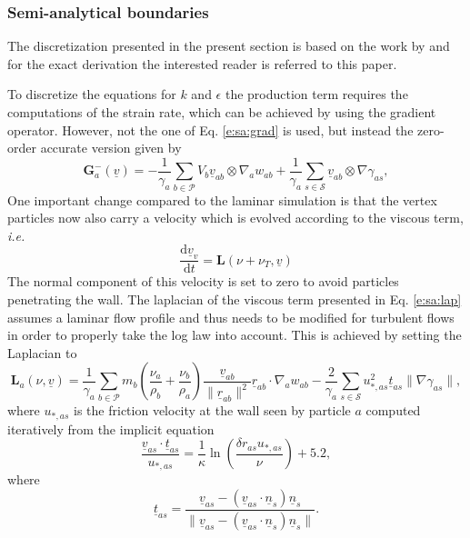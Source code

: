 \documentclass[12pt]{memoir}
\newcommand{\uvec}[1]{\underline{#1}}
\newcommand{\td}{\text{d}}
\newcommand{\tdv}[2]{\frac{\td #1}{\td #2}}
\newcommand{\ie}{\textit{i.e.}~}
\newcommand{\sumP}{\underset{b \in \mathcal{P}}{\sum}}
\newcommand{\sumS}{\underset{s \in \mathcal{S}}{\sum}}
\newcommand{\Grad}{\textbf{G}}
\newcommand{\Lap}{\textbf{L}}
\begin{document}
\subsubsection{Semi-analytical boundaries}
The discretization presented in the present section is based on the work
by \cite{leroy_unified_2014} and for the exact derivation the interested
reader is referred to this paper.

To discretize the equations for $k$ and $\epsilon$ the production term
requires the computations of the strain rate, which can be achieved by
using the gradient operator. However, not the one of Eq.
\eqref{e:sa:grad} is used, but instead the zero-order accurate version
given by
\begin{equation}
\Grad^-_a(\uvec{v}) = - \frac{1}{\gamma_a}\sumP V_b \uvec{v}_{ab} \otimes \nabla_a w_{ab}
 +\frac{1}{\gamma_a}\sumS \uvec{v}_{ab} \otimes \nabla \gamma_{as},
\label{e:turb:grad-}
\end{equation}
One important change compared to the laminar simulation is that the
vertex particles now also carry a velocity which is evolved according to
the viscous term, \ie
\begin{equation}
\tdv{\uvec{v}_v}{t} = \Lap(\nu + \nu_T, \uvec{v})
\label{e:turb:vert-vel}
\end{equation}
The normal component of this velocity is set to zero to avoid particles
penetrating the wall. The laplacian of the viscous term presented in Eq.
\eqref{e:sa:lap} assumes a laminar flow profile and thus needs to be
modified for turbulent flows in order to properly take the log law into
account. This is achieved by setting the Laplacian to
\begin{equation}
\Lap_a(\nu, \uvec{v}) = \frac{1}{\gamma_a}\sumP m_b \left(\frac{\nu_a}{\rho_b} + \frac{\nu_b}{\rho_a}\right) \frac{\uvec{v}_{ab}}{\|\uvec{r}_{ab}\|^2}\uvec{r}_{ab}\cdot \nabla_a w_{ab}
 - \frac{2}{\gamma_a} \sumS u_{*,as}^2 \uvec{t}_{as} \|\nabla \gamma_{as}\|,
\label{e:turb:lap}
\end{equation}
where $u_{*,as}$ is the friction velocity at the wall seen by particle
$a$ computed iteratively from the implicit equation
\begin{equation}
\frac{\uvec{v}_{as}\cdot\uvec{t}_{as}}{u_{*,as}} =
\frac{1}{\kappa}\ln\left( \frac{\delta r_{as} u_{*,as}}{\nu} \right) +
5.2,
\label{e:turb:fric-vel}
\end{equation}
where
\begin{equation}
\uvec{t}_{as} = \frac{\uvec{v}_{as} -
(\uvec{v}_{as}\cdot\uvec{n}_s)\uvec{n}_s}{\|\uvec{v}_{as} -
(\uvec{v}_{as}\cdot\uvec{n}_s)\uvec{n}_s\|}.
\label{e:turb:tas}
\end{equation}
\end{document}
